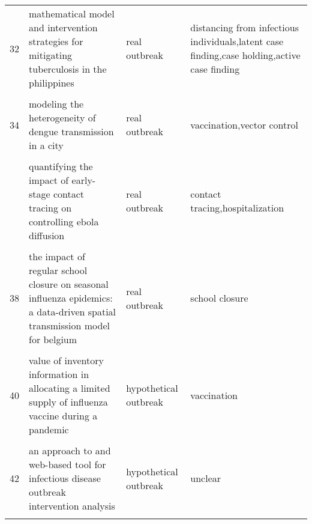 \documentclass[
]{article}
\begin{document}
\begin{landscape}
\begin{longtable}{l>{\raggedright\arraybackslash}p{3cm}l>{\raggedright\arraybackslash}p{8cm}}
32 & mathematical model and intervention strategies for mitigating tuberculosis in the philippines & real outbreak & distancing from infectious individuals,latent case finding,case holding,active case finding\\
\cellcolor{gray!6}{33} & \cellcolor{gray!6}{measles outbreak response decision-making under uncertainty: a retrospective analysis} & \cellcolor{gray!6}{real outbreak} & \cellcolor{gray!6}{vaccination}\\
34 & modeling the heterogeneity of dengue transmission in a city & real outbreak & vaccination,vector control\\
\cellcolor{gray!6}{35} & \cellcolor{gray!6}{modelling the large-scale yellow fever outbreak in luanda, angola, and the impact of vaccination} & \cellcolor{gray!6}{real outbreak} & \cellcolor{gray!6}{vaccination}\\
\addlinespace
36 & quantifying the impact of early-stage contact tracing on controlling ebola diffusion & real outbreak & contact tracing,hospitalization\\
\cellcolor{gray!6}{37} & \cellcolor{gray!6}{simulation of key interventions for seasonal influenza outbreak control at school in changsha, china} & \cellcolor{gray!6}{real outbreak} & \cellcolor{gray!6}{antiviral prophylaxis,isolation,school closure,vaccination,antiviral treatment}\\
38 & the impact of regular school closure on seasonal influenza epidemics: a data-driven spatial transmission model for belgium & real outbreak & school closure\\
\cellcolor{gray!6}{39} & \cellcolor{gray!6}{the potential impact of case-area targeted interventions in response to cholera outbreaks: a modeling study} & \cellcolor{gray!6}{real outbreak} & \cellcolor{gray!6}{vaccination,antibiotic prophylaxis,point-of-use water treatment}\\
40 & value of inventory information in allocating a limited supply of influenza vaccine during a pandemic & hypothetical outbreak & vaccination\\
\addlinespace
\cellcolor{gray!6}{41} & \cellcolor{gray!6}{an age-structured model for cholera control with vaccination} & \cellcolor{gray!6}{hypothetical outbreak} & \cellcolor{gray!6}{vaccination}\\
42 & an approach to and web-based tool for infectious disease outbreak intervention analysis & hypothetical outbreak & unclear\\
\cellcolor{gray!6}{43} & \cellcolor{gray!6}{an economic assessment of foot and mouth disease in japan} & \cellcolor{gray!6}{hypothetical outbreak} & \cellcolor{gray!6}{culling,vaccination,early detection}\\

\end{longtable}
\end{landscape}
\end{document}
